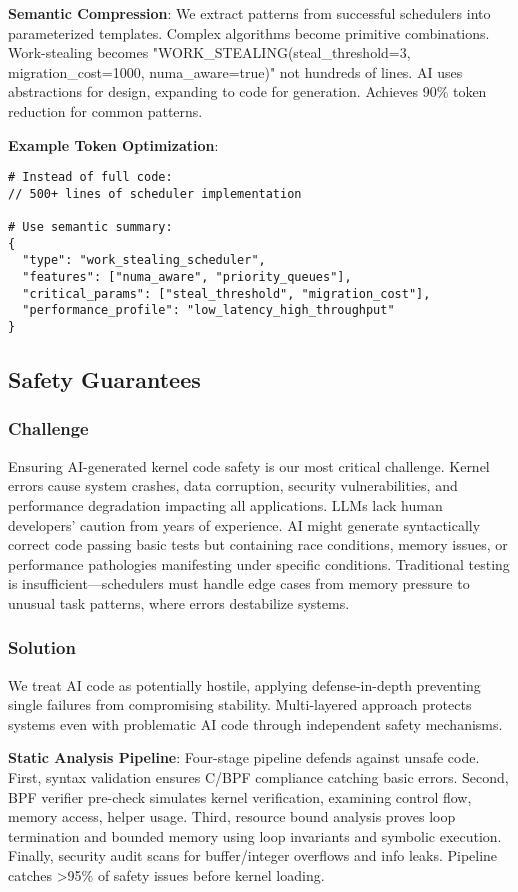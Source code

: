 \textbf{Semantic Compression}: We extract patterns from successful schedulers into parameterized templates. Complex algorithms become primitive combinations. Work-stealing becomes "WORK\_STEALING(steal\_threshold=3, migration\_cost=1000, numa\_aware=true)" not hundreds of lines. AI uses abstractions for design, expanding to code for generation. Achieves 90\% token reduction for common patterns.

\textbf{Example Token Optimization}:
\begin{verbatim}
# Instead of full code:
// 500+ lines of scheduler implementation

# Use semantic summary:
{
  "type": "work_stealing_scheduler",
  "features": ["numa_aware", "priority_queues"],
  "critical_params": ["steal_threshold", "migration_cost"],
  "performance_profile": "low_latency_high_throughput"
}
\end{verbatim}

\subsection{Safety Guarantees}

\subsubsection{Challenge}
Ensuring AI-generated kernel code safety is our most critical challenge. Kernel errors cause system crashes, data corruption, security vulnerabilities, and performance degradation impacting all applications. LLMs lack human developers' caution from years of experience. AI might generate syntactically correct code passing basic tests but containing race conditions, memory issues, or performance pathologies manifesting under specific conditions. Traditional testing is insufficient—schedulers must handle edge cases from memory pressure to unusual task patterns, where errors destabilize systems.

\subsubsection{Solution}
We treat AI code as potentially hostile, applying defense-in-depth preventing single failures from compromising stability. Multi-layered approach protects systems even with problematic AI code through independent safety mechanisms.

\textbf{Static Analysis Pipeline}: Four-stage pipeline defends against unsafe code. First, syntax validation ensures C/BPF compliance catching basic errors. Second, BPF verifier pre-check simulates kernel verification, examining control flow, memory access, helper usage. Third, resource bound analysis proves loop termination and bounded memory using loop invariants and symbolic execution. Finally, security audit scans for buffer/integer overflows and info leaks. Pipeline catches >95\% of safety issues before kernel loading.

